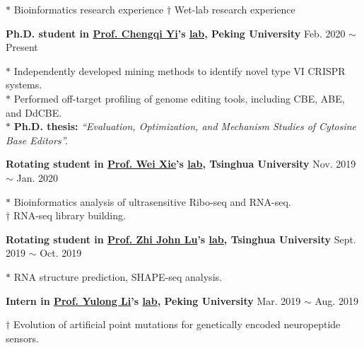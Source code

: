 
\vspace{-.75em}
\small
$*$ Bioinformatics research experience \hspace{2em} $\dagger$ Wet-lab research experience

\normalsize
\vspace{10pt}

\textbf{Ph.D. student in \href{https://www.bio.pku.edu.cn/enhomes/news/teacher_dis/91.html}{Prof. Chengqi Yi}'s \href{https://yilab.org.cn/}{lab}, Peking University} \hfill Feb. 2020 $\sim$ Present

{\small
$*$ Independently developed mining methods to identify novel type VI CRISPR systems.\\
$*$ Performed off-target profiling of genome editing tools, including CBE, ABE, and DdCBE\cite{lei2022mitochondrial,rao2023characterizing,lei2021detect,lei2023detect}.\\
$*$ \textbf{Ph.D. thesis:} \textit{``Evaluation, Optimization, and Mechanism Studies of Cytosine Base Editors''.}
}

\vspace{5pt}

\textbf{Rotating student in \href{https://life.tsinghua.edu.cn/lifeen/info/1034/1077.htm}{Prof. Wei Xie}'s \href{http://www.xielab.org.cn/}{lab}, Tsinghua University} \hfill Nov. 2019 $\sim$ Jan. 2020

{\small
$*$ Bioinformatics analysis of ultrasensitive Ribo-seq and RNA-seq.\\
$\dagger$ RNA-seq library building.
}

\vspace{5pt}

\textbf{Rotating student in \href{https://life.tsinghua.edu.cn/lifeen/info/1034/1083.htm}{Prof. Zhi John Lu}'s \href{https://lulab.life.tsinghua.edu.cn/labhome/home/}{lab}, Tsinghua University} \hfill Sept. 2019 $\sim$ Oct. 2019

{\small
$*$ RNA structure prediction\cite{zhu2021integrative}, SHAPE-seq analysis.
}


\vspace{5pt}


\textbf{Intern in \href{https://www.bio.pku.edu.cn/enhomes/news/teacher_dis/43.html}{Prof. Yulong Li}'s \href{http://www.yulonglilab.org/}{lab}, Peking University} \hfill Mar. 2019 $\sim$ Aug. 2019

{\small
$\dagger$ Evolution of artificial point mutations for genetically encoded neuropeptide sensors.
}


